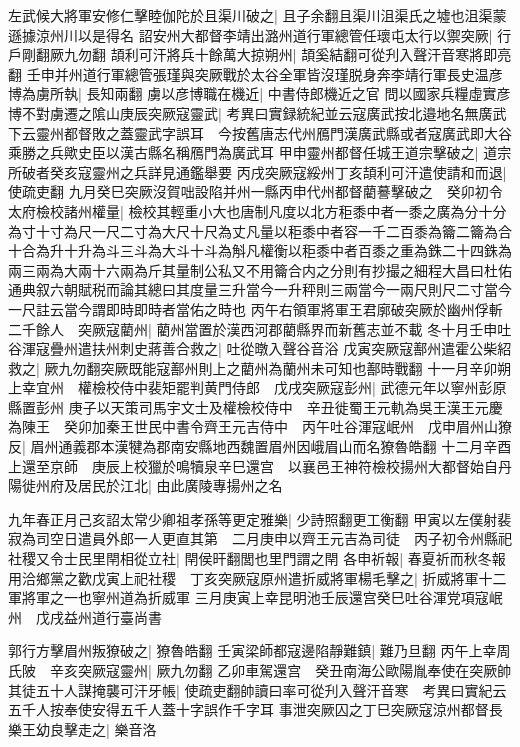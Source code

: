 左武候大將軍安修仁擊睦伽陀於且渠川破之|{
	且子余翻且渠川沮渠氏之墟也沮渠蒙遜據涼州川以是得名}
詔安州大都督李靖出潞州道行軍總管任瓌屯太行以禦突厥|{
	行戶剛翻厥九勿翻}
頡利可汗將兵十餘萬大掠朔州|{
	頡奚結翻可從刋入聲汗音寒將即亮翻}
壬申并州道行軍總管張瑾與突厥戰於太谷全軍皆沒瑾脱身奔李靖行軍長史温彦博為虜所執|{
	長知兩翻}
虜以彦博職在機近|{
	中書侍郎機近之官}
問以國家兵糧虛實彦博不對虜遷之隂山庚辰突厥寇靈武|{
	考異曰實録統紀並云寇廣武按北邉地名無廣武下云靈州都督敗之蓋靈武字誤耳　今按舊唐志代州鴈門漢廣武縣或者寇廣武即大谷乘勝之兵歟史臣以漢古縣名稱鴈門為廣武耳}
甲申靈州都督任城王道宗擊破之|{
	道宗所破者癸亥寇靈州之兵詳見通鑑舉要}
丙戌突厥寇綏州丁亥頡利可汗遣使請和而退|{
	使疏吏翻}
九月癸巳突厥沒賀咄設陷并州一縣丙申代州都督藺謩擊破之　癸卯初令太府檢校諸州權量|{
	檢校其輕重小大也唐制凡度以北方秬黍中者一黍之廣為分十分為寸十寸為尺一尺二寸為大尺十尺為丈凡量以秬黍中者容一千二百黍為籥二籥為合十合為升十升為斗三斗為大斗十斗為斛凡權衡以秬黍中者百黍之重為銖二十四銖為兩三兩為大兩十六兩為斤其量制公私又不用籥合内之分則有抄撮之細程大昌曰杜佑通典叙六朝賦税而論其總曰其度量三升當今一升秤則三兩當今一兩尺則尺二寸當今一尺註云當今謂即時即時者當佑之時也}
丙午右領軍將軍王君廓破突厥於幽州俘斬二千餘人　突厥寇藺州|{
	藺州當置於漢西河郡藺縣界而新舊志並不載}
冬十月壬申吐谷渾寇疊州遣扶州刺史蔣善合救之|{
	吐從暾入聲谷音浴}
戊寅突厥寇鄯州遣霍公柴紹救之|{
	厥九勿翻突厥既能寇鄯州則上之藺州為蘭州未可知也鄯時戰翻}
十一月辛卯朔上幸宜州　權檢校侍中裴矩罷判黄門侍郎　戊戌突厥寇彭州|{
	武德元年以寧州彭原縣置彭州}
庚子以天策司馬宇文士及權檢校侍中　辛丑徙蜀王元軌為吳王漢王元慶為陳王　癸卯加秦王世民中書令齊王元吉侍中　丙午吐谷渾寇岷州　戊申眉州山獠反|{
	眉州通義郡本漢犍為郡南安縣地西魏置眉州因峨眉山而名獠魯皓翻}
十二月辛酉上還至京師　庚辰上校獵於鳴犢泉辛巳還宫　以襄邑王神符檢校揚州大都督始自丹陽徙州府及居民於江北|{
	由此廣陵專揚州之名}


九年春正月己亥詔太常少卿祖孝孫等更定雅樂|{
	少詩照翻更工衡翻}
甲寅以左僕射裴寂為司空日遣員外郎一人更直其第　二月庚申以齊王元吉為司徒　丙子初令州縣祀社稷又令士民里閈相從立社|{
	閈侯旰翻閭也里門謂之閈}
各申祈報|{
	春夏祈而秋冬報}
用洽鄉黨之歡戊寅上祀社稷　丁亥突厥寇原州遣折威將軍楊毛擊之|{
	折威將軍十二軍將軍之一也寧州道為折威軍}
三月庚寅上幸昆明池壬辰還宫癸巳吐谷渾党項寇岷州　戊戌益州道行臺尚書

郭行方擊眉州叛獠破之|{
	獠魯皓翻}
壬寅梁師都寇邊陷靜難鎮|{
	難乃旦翻}
丙午上幸周氏陂　辛亥突厥寇靈州|{
	厥九勿翻}
乙卯車駕還宫　癸丑南海公歐陽胤奉使在突厥帥其徒五十人謀掩襲可汗牙帳|{
	使疏吏翻帥讀曰率可從刋入聲汗音寒　考異曰實紀云五千人按奉使安得五千人蓋十字誤作千字耳}
事泄突厥囚之丁巳突厥寇涼州都督長樂王幼良擊走之|{
	樂音洛}


